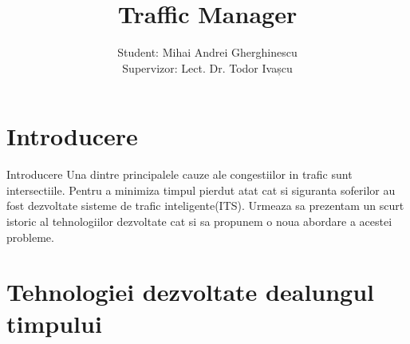 \documentclass{beamer}
\date{}
\title{Traffic Manager}
\author{Student: Mihai Andrei Gherghinescu \\ Supervizor: Lect. Dr. Todor Ivașcu}
\begin{document}
\frame{\titlepage}

\section{Introducere}
    \begin{frame}{Introducere}
        Una dintre principalele cauze ale congestiilor in trafic
        sunt intersectiile. Pentru a minimiza timpul pierdut atat cat si siguranta soferilor 
        au fost dezvoltate sisteme de trafic inteligente(ITS). Urmeaza sa prezentam 
        un scurt istoric al tehnologiilor dezvoltate cat si sa propunem o noua abordare a 
        acestei probleme.
    \end{frame}

\section{Tehnologiei dezvoltate dealungul timpului}
\end{document}
